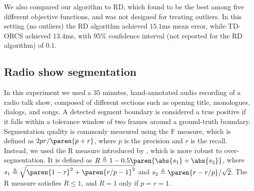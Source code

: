 We also compared our algorithm to RD, which \cite{phonemeSeg:2008} found to be the best
among five different objective functions, and was not designed for
treating outliers. In this setting (no outliers) the RD algorithm achieved
$15.1$ms mean error, while TD-ORCS achieved $13.4$ms, with $95$\% confidence interval (not
reported for the RD algorithm) of $0.1$.


\subsection{Radio show segmentation}
In this experiment we used a $35$ minutes, hand-annotated audio
recording of a radio talk show, composed of different
sections such as opening title, monologues, dialogs, and songs.
A detected segment boundary is considered a true positive if it falls within a tolerance window of two frames around a ground-truth boundary. Segmentation quality is commonly measured using the F measure, which is defined as $2pr/\paren{p+r}$, where $p$ is the precision and $r$ is the recall.
Instead, we used the R measure introduced by \cite{Rasanen2009}, which is more robust
to over-segmentation. It is defined as $R\triangleq1-0.5\paren{\abs{s_1}+\abs{s_2}}$, where $s_1\triangleq\sqrt{\paren{1-r}^2+\paren{r/p-1}^2}$ and $s_2\triangleq\paren{r-r/p}/\sqrt{2}$.
The R measure satisfies $R\leq1$,
and $R=1$ only if $p=r=1$.

